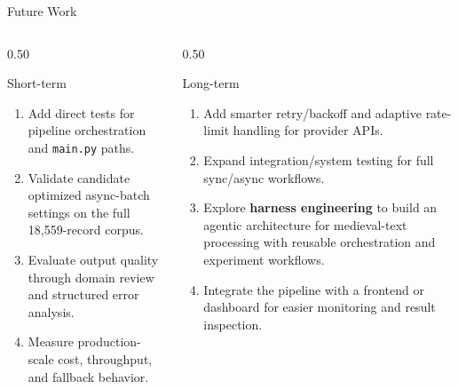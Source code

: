 \documentclass[
        11pt,
        compress,
        xcolor={dvipsnames}
    ]{beamer}
\begin{document}
\begin{frame}{Future Work}
  \begin{columns}[T]
    \begin{column}{0.50\textwidth}
      \begin{block}{Short-term}
        \scriptsize
        \begin{enumerate}\setlength{\itemsep}{0.3em}
          \item Add direct tests for pipeline orchestration and \texttt{main.py} paths.
          \item Validate candidate optimized async-batch settings on the full 18,559-record corpus.
          \item Evaluate output quality through domain review and structured error analysis.
          \item Measure production-scale cost, throughput, and fallback behavior.
        \end{enumerate}
      \end{block}
    \end{column}
    \begin{column}{0.50\textwidth}
      \begin{block}{Long-term}
        \scriptsize
        \begin{enumerate}\setlength{\itemsep}{0.3em}
          \item Add smarter retry/backoff and adaptive rate-limit handling for provider APIs.
          \item Expand integration/system testing for full sync/async workflows.
          \item Explore \textbf{harness engineering}\footnotemark{} to build
            an agentic architecture for medieval-text processing with reusable
            orchestration and experiment workflows.
          \item Integrate the pipeline with a frontend or dashboard for
            easier monitoring and result inspection.
        \end{enumerate}
      \end{block}
    \end{column}
  \end{columns}
\end{frame}
\end{document}
